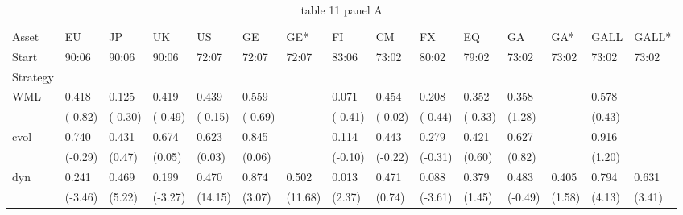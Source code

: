 \begin{table}[htbp]
  \centering
  \caption{table 11 panel A}
  \label{tab:table_11_panel_A}
  \begin{tabular}{lllllllllllllll}
\toprule
Asset & EU & JP & UK & US & GE & GE* & FI & CM & FX & EQ & GA & GA* & GALL & GALL* \\
Start & 90:06 & 90:06 & 90:06 & 72:07 & 72:07 & 72:07 & 83:06 & 73:02 & 80:02 & 79:02 & 73:02 & 73:02 & 73:02 & 73:02 \\
Strategy &  &  &  &  &  &  &  &  &  &  &  &  &  &  \\
\midrule
WML & 0.418 & 0.125 & 0.419 & 0.439 & 0.559 &  & 0.071 & 0.454 & 0.208 & 0.352 & 0.358 &  & 0.578 &  \\
 & (-0.82) & (-0.30) & (-0.49) & (-0.15) & (-0.69) &  & (-0.41) & (-0.02) & (-0.44) & (-0.33) & (1.28) &  & (0.43) &  \\
cvol & 0.740 & 0.431 & 0.674 & 0.623 & 0.845 &  & 0.114 & 0.443 & 0.279 & 0.421 & 0.627 &  & 0.916 &  \\
 & (-0.29) & (0.47) & (0.05) & (0.03) & (0.06) &  & (-0.10) & (-0.22) & (-0.31) & (0.60) & (0.82) &  & (1.20) &  \\
dyn & 0.241 & 0.469 & 0.199 & 0.470 & 0.874 & 0.502 & 0.013 & 0.471 & 0.088 & 0.379 & 0.483 & 0.405 & 0.794 & 0.631 \\
 & (-3.46) & (5.22) & (-3.27) & (14.15) & (3.07) & (11.68) & (2.37) & (0.74) & (-3.61) & (1.45) & (-0.49) & (1.58) & (4.13) & (3.41) \\
\bottomrule
\end{tabular}

\end{table}
